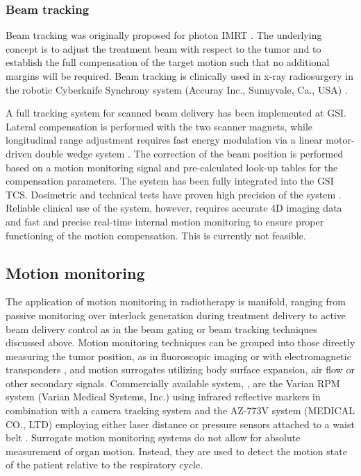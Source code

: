 \subsubsection{Beam tracking}
Beam tracking was originally proposed for photon \ac{IMRT}
\citep{Keall2001}. The underlying concept is to adjust the treatment
beam with respect to the tumor and to establish the full compensation
of the target motion such that no additional margins will be
required. Beam tracking is clinically used in x-ray radiosurgery in
the robotic Cyberknife Synchrony system (Accuray Inc.\@, Sunnyvale,
Ca.\@, \acs{USA}) \citep{Brown2007a,Kilby2010}.

A full tracking system for scanned beam delivery has been implemented
at \ac{GSI}. Lateral compensation is performed with the two scanner
magnets, while longitudinal range adjustment requires fast energy
modulation via a linear motor-driven double wedge system
\citep{Weber2000}. The correction of the beam position is performed
based on a motion monitoring signal and pre-calculated look-up tables
for the compensation parameters. The system has been fully integrated
into the \ac{GSI} \acl{TCS}. Dosimetric and technical tests have
proven high precision of the system
\citep{Bert2007,Bert2010,Saito2009}. Reliable clinical use of the
system, however, requires accurate \ac{4D} imaging data and fast and
precise real-time internal motion monitoring to ensure proper
functioning of the motion compensation. This is currently not
feasible.

\subsection{Motion monitoring}
\label{sec:background:monitoring}
The application of motion monitoring in radiotherapy is manifold,
ranging from passive monitoring over interlock generation during
treatment delivery to active beam delivery control as in the beam
gating or beam tracking techniques discussed above. Motion monitoring
techniques can be grouped into those directly measuring the tumor
position, as in fluoroscopic imaging \citep{Shirato2000, Berbeco2004}
or with electromagnetic transponders \citep{Balter2005}, and motion
surrogates utilizing body surface expansion, air flow or other
secondary signals. Commercially available system, \eg, are the Varian
RPM system (Varian Medical Systems, Inc.\@) using infrared reflective
markers in combination with a camera tracking system and the \ANZAI
AZ-773V system (\ANZAI MEDICAL CO.\@, LTD) employing either laser
distance or pressure sensors attached to a waist belt
\citep{Li2006}. Surrogate motion monitoring systems do not allow for
absolute measurement of organ motion. Instead, they are used to detect 
the motion state of the patient relative to the respiratory cycle.


